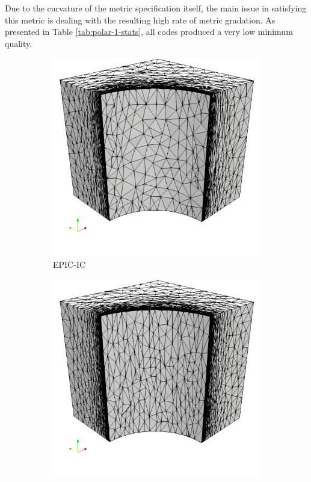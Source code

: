 \documentclass[3p,times,procedia,number]{elsarticle}
\begin{document}
Due to the curvature of the metric specification itself,
the main issue in satisfying this metric is dealing with the
resulting high rate of metric gradation.
As presented in Table \ref{tab:polar-1-stats}, all codes produced
a very low minimum quality.
\begin{figure}
\begin{subfigure}{.24\textwidth}
\centering
\includegraphics[width=\textwidth]{epic-ic-cube-cylinder-polar-1.png}
\caption{EPIC-IC}
\end{subfigure}
\begin{subfigure}{.24\textwidth}
\centering
\includegraphics[width=\textwidth]{epic-ics-cube-cylinder-polar-1.png}

\end{subfigure}
\end{figure}
\end{document}
